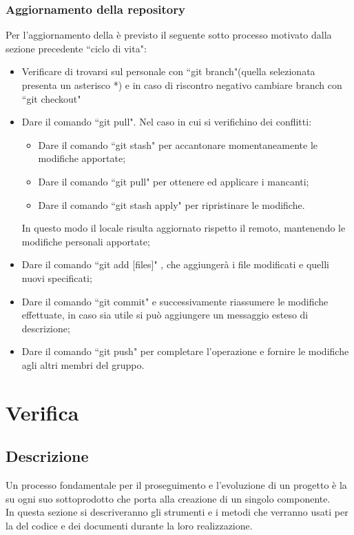 \documentclass[NormeDiProgetto.tex]{subfiles}
\begin{document}
	\subsubsection{Aggiornamento della repository}
	Per l'aggiornamento della  è previsto il seguente sotto processo motivato dalla sezione precedente \textquotedblleft ciclo di vita":
	\begin{itemize}
		\item Verificare di trovarsi sul  personale con \textquotedblleft git branch"(quella selezionata presenta un asterisco *) e in caso di riscontro negativo cambiare branch con \textquotedblleft git checkout"
		\item Dare il comando \textquotedblleft git pull". Nel caso in cui si verifichino dei conflitti:
		\begin{itemize}
			\item Dare il comando \textquotedblleft git stash" per accantonare momentaneamente	le modifiche apportate;
			\item Dare il comando \textquotedblleft git pull" per ottenere ed applicare i  mancanti;
			\item Dare il comando \textquotedblleft git stash apply" per ripristinare le modifiche.
		\end{itemize}
		In questo modo il  locale risulta aggiornato rispetto il  remoto, mantenendo le modifiche personali apportate;
	
		\item Dare il comando \textquotedblleft git add [files]" , che aggiungerà i file modificati e quelli nuovi specificati;
		\item Dare il comando \textquotedblleft git commit" e successivamente riassumere le modifiche effettuate, in caso sia utile si può aggiungere un messaggio esteso di descrizione;
		\item Dare il comando \textquotedblleft git push" per completare l'operazione e fornire le modifiche agli altri membri del gruppo.
	\end{itemize}

	
	\section{Verifica}
	
	\subsection{Descrizione}
	Un processo fondamentale per il proseguimento e l'evoluzione di un progetto è la  su ogni suo sottoprodotto che porta alla creazione di un singolo componente.\\
	In questa sezione si descriveranno gli strumenti e i metodi che verranno usati per la  del codice e dei documenti durante la loro realizzazione.\\
	
\end{document}
